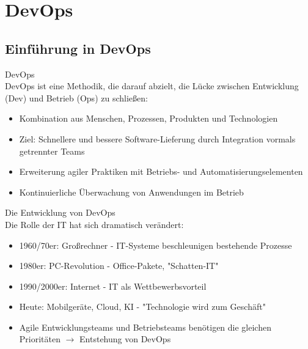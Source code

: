 \section{DevOps}

\subsection{Einführung in DevOps}

\begin{definition}{DevOps}\\
    DevOps ist eine Methodik, die darauf abzielt, die Lücke zwischen Entwicklung (Dev) und Betrieb (Ops) zu schließen:
    \begin{itemize}
        \item Kombination aus Menschen, Prozessen, Produkten und Technologien
        \item Ziel: Schnellere und bessere Software-Lieferung durch Integration vormals getrennter Teams
        \item Erweiterung agiler Praktiken mit Betriebs- und Automatisierungselementen
        \item Kontinuierliche Überwachung von Anwendungen im Betrieb
    \end{itemize}
\end{definition}

\begin{concept}{Die Entwicklung von DevOps}\\
    Die Rolle der IT hat sich dramatisch verändert:
    \begin{itemize}
        \item 1960/70er: Großrechner - IT-Systeme beschleunigen bestehende Prozesse
        \item 1980er: PC-Revolution - Office-Pakete, "Schatten-IT"
        \item 1990/2000er: Internet - IT als Wettbewerbsvorteil
        \item Heute: Mobilgeräte, Cloud, KI - "Technologie wird zum Geschäft"
        \item Agile Entwicklungsteams und Betriebsteams benötigen die gleichen Prioritäten $\rightarrow$ Entstehung von DevOps
    \end{itemize}
\end{concept}

